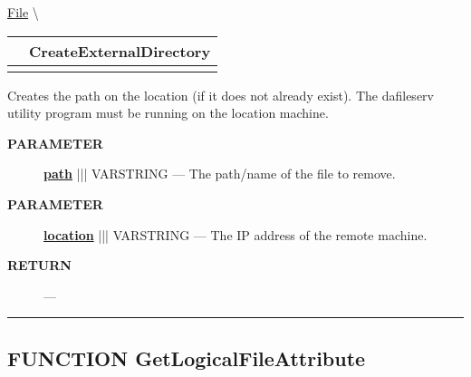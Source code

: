 \hypertarget{ecldoc:file.createexternaldirectory}{}
\hspace{0pt} \hyperlink{ecldoc:File}{File} \textbackslash 

{\renewcommand{\arraystretch}{1.5}
\begin{tabularx}{\textwidth}{|>{\raggedright\arraybackslash}l|X|}
\hline
\hspace{0pt}\mytexttt{\color{red} } & \textbf{CreateExternalDirectory} \\
\hline
\multicolumn{2}{|>{\raggedright\arraybackslash}X|}{\hspace{0pt}\mytexttt{\color{param} (varstring location, varstring path)}} \\
\hline
\end{tabularx}
}

\par





Creates the path on the location (if it does not already exist). The dafileserv utility program must be running on the location machine.






\par
\begin{description}
\item [\colorbox{tagtype}{\color{white} \textbf{\textsf{PARAMETER}}}] \textbf{\underline{path}} ||| VARSTRING --- The path/name of the file to remove.
\item [\colorbox{tagtype}{\color{white} \textbf{\textsf{PARAMETER}}}] \textbf{\underline{location}} ||| VARSTRING --- The IP address of the remote machine.
\end{description}







\par
\begin{description}
\item [\colorbox{tagtype}{\color{white} \textbf{\textsf{RETURN}}}] \textbf{} --- 
\end{description}




\rule{\linewidth}{0.5pt}
\subsection*{\textsf{\colorbox{headtoc}{\color{white} FUNCTION}
GetLogicalFileAttribute}}

